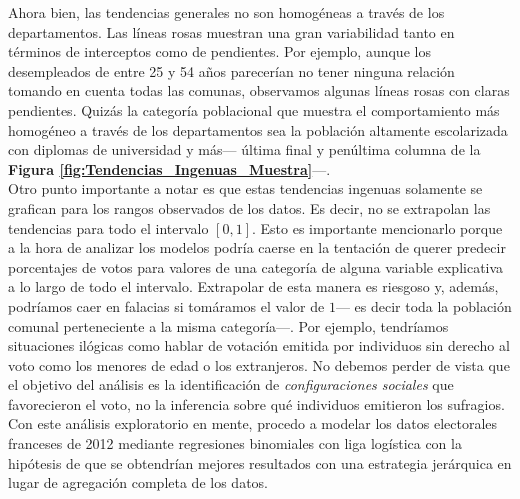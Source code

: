 Ahora bien, las tendencias generales no son homogéneas a través de los departamentos. Las líneas rosas muestran una gran variabilidad tanto en términos de interceptos como de pendientes. Por ejemplo, aunque los desempleados de entre 25 y 54 años parecerían no tener ninguna relación tomando en cuenta todas las comunas, observamos algunas líneas rosas con claras pendientes. Quizás la categoría poblacional que muestra el comportamiento más homogéneo a través de los departamentos sea la población altamente escolarizada con diplomas de universidad y más--- última final y penúltima columna de la \textbf{Figura \ref{fig:Tendencias_Ingenuas_Muestra}}---.\\

Otro punto importante a notar es que estas tendencias ingenuas solamente se grafican para los rangos observados de los datos. Es decir, no se extrapolan las tendencias para todo el intervalo $[0,1]$. Esto es importante mencionarlo porque a la hora de analizar los modelos podría caerse en la tentación de querer predecir porcentajes de votos para valores de una categoría de alguna variable explicativa a lo largo de todo el intervalo. Extrapolar de esta manera es riesgoso y, además, podríamos caer en falacias si tomáramos el valor de $1$--- es decir toda la población comunal perteneciente a la misma categoría---. Por ejemplo, tendríamos situaciones ilógicas como hablar de votación emitida por individuos sin derecho al voto como los menores de edad o los extranjeros. No debemos perder de vista que el objetivo del análisis es la identificación de \textit{configuraciones sociales} que favorecieron el voto, no la inferencia sobre qué individuos emitieron los sufragios.\label{No_Extrapolar}\\

Con este análisis exploratorio en mente, procedo a modelar los datos electorales franceses de 2012 mediante regresiones binomiales con liga logística con la hipótesis de que se obtendrían mejores resultados con una estrategia jerárquica en lugar de agregación completa de los datos. 

